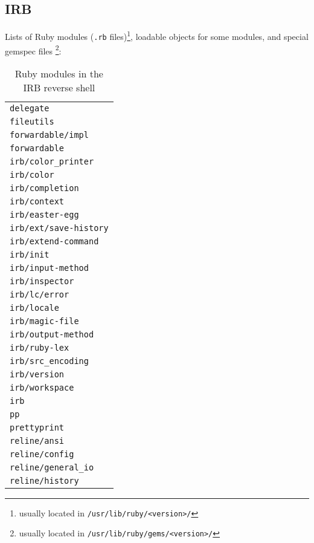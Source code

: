 \subsection*{IRB}


Lists of Ruby modules (\texttt{.rb} files)\footnote{usually located in \texttt{/usr/lib/ruby/<version>/}}, loadable objects for some modules, and special gemspec files \footnote{usually located in \texttt{/usr/lib/ruby/gems/<version>/}}:

\begin{longtable}{l}
\caption{Ruby modules in the IRB reverse shell}\label{tab:irb-dpd-mod} \\
\texttt{delegate} \\
\texttt{fileutils} \\
\texttt{forwardable/impl} \\
\texttt{forwardable} \\
\texttt{irb/color\_printer} \\
\texttt{irb/color} \\
\texttt{irb/completion} \\
\texttt{irb/context} \\
\texttt{irb/easter-egg} \\
\texttt{irb/ext/save-history} \\
\texttt{irb/extend-command} \\
\texttt{irb/init} \\
\texttt{irb/input-method} \\
\texttt{irb/inspector} \\
\texttt{irb/lc/error} \\
\texttt{irb/locale} \\
\texttt{irb/magic-file} \\
\texttt{irb/output-method} \\
\texttt{irb/ruby-lex} \\
\texttt{irb/src\_encoding} \\
\texttt{irb/version} \\
\texttt{irb/workspace} \\
\texttt{irb} \\
\texttt{pp} \\
\texttt{prettyprint} \\
\texttt{reline/ansi} \\
\texttt{reline/config} \\
\texttt{reline/general\_io} \\
\texttt{reline/history} \\

\end{longtable}
